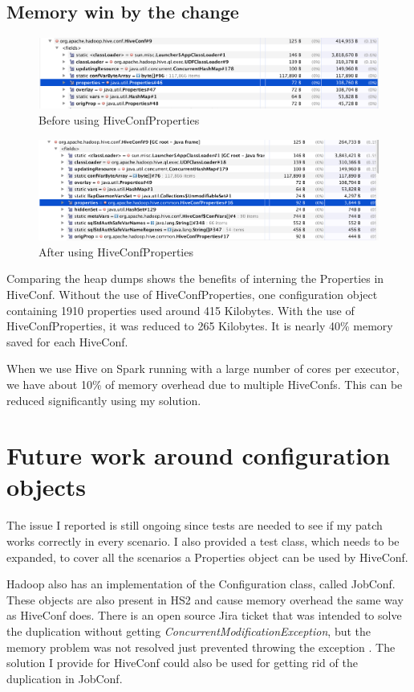 \subsection{Memory win by the change}
\begin{figure}[H]
	\includegraphics[width=150mm, keepaspectratio]{figures/hiveconf_orig.png}
	\centering
	\caption{Before using HiveConfProperties}
\end{figure}

\begin{figure}[H]
	\includegraphics[width=150mm, keepaspectratio]{figures/hiveconf_interned.png}
	\centering
	\caption{After using HiveConfProperties}
\end{figure}

Comparing the heap dumps shows the benefits of interning the Properties in HiveConf. Without the use of HiveConfProperties, one configuration object containing 1910 properties used around 415 Kilobytes. With the use of HiveConfProperties, it was reduced to 265 Kilobytes. It is nearly 40\% memory saved for each HiveConf. 

When we use Hive on Spark running with a large number of cores per executor, we have about 10\% of memory overhead due to multiple HiveConfs. This can be reduced significantly using my solution. 

\section{Future work around configuration objects}
The issue I reported is still ongoing since tests are needed to see if my patch works correctly in every scenario. I also provided a test class, which needs to be expanded, to cover all the scenarios a Properties object can be used by HiveConf. 

Hadoop also has an implementation of the Configuration class, called JobConf. These objects are also present in HS2 and cause memory overhead the same way as HiveConf does. There is an open source Jira ticket that was intended to solve the duplication without getting \textit{ConcurrentModificationException}, but the memory problem was not resolved just prevented throwing the exception \cite{hive-jobconf}. The solution I provide for HiveConf could also be used for getting rid of the duplication in JobConf.